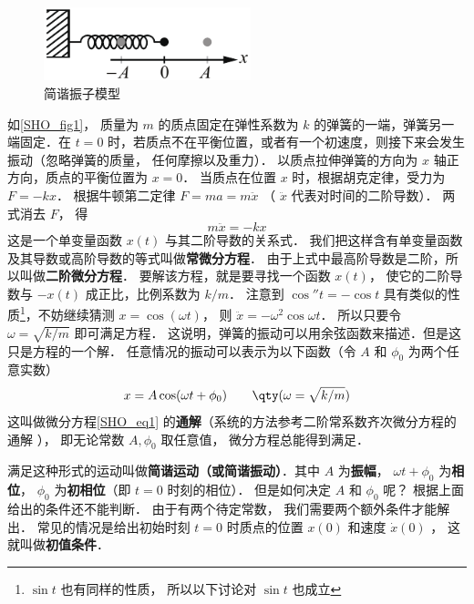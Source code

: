 

\begin{figure}[ht]
\centering
\includegraphics[width=6cm]{./figures/SHO1.pdf}
\caption{简谐振子模型} \label{SHO_fig1}
\end{figure}

如\autoref{SHO_fig1}， 质量为 $m$ 的质点固定在弹性系数为 $k$ 的弹簧的一端，弹簧另一端固定．在 $t = 0$ 时，若质点不在平衡位置，或者有一个初速度，则接下来会发生振动（忽略弹簧的质量， 任何摩擦以及重力）． 以质点拉伸弹簧的方向为 $x$ 轴正方向，质点的平衡位置为 $x = 0$． 当质点在位置 $x$ 时，根据胡克定律，受力为 $F =  - kx$． 根据牛顿第二定律 $F = ma = m\ddot x$ （ $\ddot x$ 代表对时间的二阶导数）．  两式消去 $F$， 得
\begin{equation}\label{SHO_eq1}
m\ddot x =  - kx
\end{equation}
这是一个单变量函数 $x(t)$ 与其二阶导数的关系式． 我们把这样含有单变量函数及其导数或高阶导数的等式叫做\textbf{常微分方程}． 由于上式中最高阶导数是二阶，所以叫做\textbf{二阶微分方程}． 要解该方程，就是要寻找一个函数 $x(t)$， 使它的二阶导数与 $- x(t)$ 成正比，比例系数为 $k/m$． 注意到 $\cos'' t =  - \cos t$ 具有类似的性质\footnote{$\sin t$ 也有同样的性质， 所以以下讨论对 $\sin t$ 也成立}，不妨继续猜测 $x = \cos(\omega t)$， 则 $\ddot x =  - {\omega ^2}\cos \omega t$． 所以只要令 $\omega = \sqrt{k/m}$ 即可满足方程． 这说明，弹簧的振动可以用余弦函数来描述．但是这只是方程的一个解． 任意情况的振动可以表示为以下函数（令 $A$ 和 $\phi_0$ 为两个任意实数）
\begin{equation}\label{SHO_eq2}
x = A\cos(\omega t + \phi_0)  \qquad \qty(\omega  = \sqrt{k/m})
\end{equation}
这叫做微分方程\autoref{SHO_eq1} 的\textbf{通解}（系统的方法参考二阶常系数齐次微分方程的通解
）， 即无论常数 $A, \phi_0$ 取任意值， 微分方程总能得到满足．

满足这种形式的运动叫做\textbf{简谐运动（或简谐振动）}．其中 $A$ 为\textbf{振幅}， $\omega t + \phi_0$ 为\textbf{相位}， $\phi_0$ 为\textbf{初相位}（即 $t = 0$ 时刻的相位）． 但是如何决定 $A$ 和 $\phi_0$ 呢？ 根据上面给出的条件还不能判断． 由于有两个待定常数， 我们需要两个额外条件才能解出． 常见的情况是给出初始时刻 $t = 0$ 时质点的位置 $x(0)$ 和速度 $\dot x(0)$ ， 这就叫做\textbf{初值条件}．

